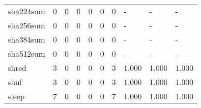 \begin{longtable}{lp{2.0cm}p{2.0cm}p{2.0cm}p{2.0cm}p{2.0cm}p{2.0cm}p{2.0cm}p{2.0cm}p{2.0cm}}
sha224sum &                      0 &                                             0 &                                            0 &                                           0 &                                            0 &                                          0 &                                    - &                                      - &                                    - \\
sha256sum &                      0 &                                             0 &                                            0 &                                           0 &                                            0 &                                          0 &                                    - &                                      - &                                    - \\
sha384sum &                      0 &                                             0 &                                            0 &                                           0 &                                            0 &                                          0 &                                    - &                                      - &                                    - \\
sha512sum &                      0 &                                             0 &                                            0 &                                           0 &                                            0 &                                          0 &                                    - &                                      - &                                    - \\
shred     &                      3 &                                             0 &                                            0 &                                           0 &                                            0 &                                          3 &                                1.000 &                                  1.000 &                                1.000 \\
shuf      &                      3 &                                             0 &                                            0 &                                           0 &                                            0 &                                          3 &                                1.000 &                                  1.000 &                                1.000 \\
sleep     &                      7 &                                             0 &                                            0 &                                           0 &                                            0 &                                          7 &                                1.000 &                                  1.000 &                                1.000 \\

\end{longtable}
